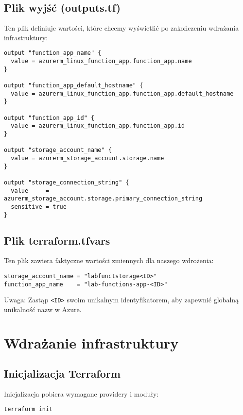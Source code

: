 \documentclass{article}
\begin{document}
\subsection{Plik wyjść (outputs.tf)}

Ten plik definiuje wartości, które chcemy wyświetlić po zakończeniu wdrażania infrastruktury:

\begin{lstlisting}[language=HCL]
output "function_app_name" {
  value = azurerm_linux_function_app.function_app.name
}

output "function_app_default_hostname" {
  value = azurerm_linux_function_app.function_app.default_hostname
}

output "function_app_id" {
  value = azurerm_linux_function_app.function_app.id
}

output "storage_account_name" {
  value = azurerm_storage_account.storage.name
}

output "storage_connection_string" {
  value     = azurerm_storage_account.storage.primary_connection_string
  sensitive = true
}
\end{lstlisting}

\subsection{Plik terraform.tfvars}

Ten plik zawiera faktyczne wartości zmiennych dla naszego wdrożenia:

\begin{lstlisting}[language=HCL]
storage_account_name = "labfunctstorage<ID>"
function_app_name    = "lab-functions-app-<ID>"
\end{lstlisting}

Uwaga: Zastąp \texttt{<ID>} swoim unikalnym identyfikatorem, aby zapewnić globalną unikalność nazw w Azure.

\section{Wdrażanie infrastruktury}

\subsection{Inicjalizacja Terraform}

Inicjalizacja pobiera wymagane providery i moduły:

\begin{lstlisting}[language=bash]
terraform init
\end{lstlisting}
\end{document}
